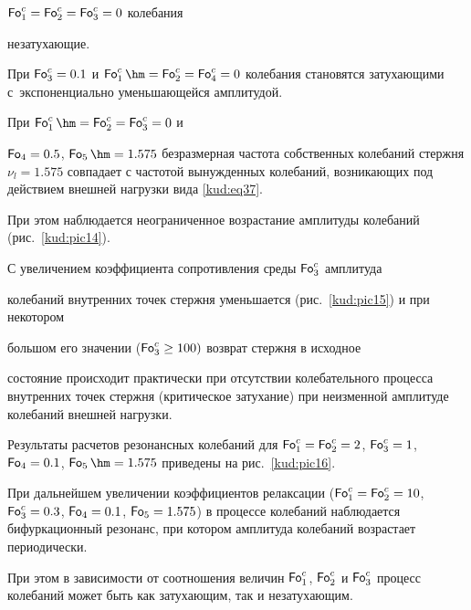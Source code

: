 $\operatorname{\sf Fo}_ 1^c =\operatorname{\sf Fo}_ {2}^c =\operatorname{\sf Fo}_3^c =0$ колебания

незатухающие. 

При $\operatorname{\sf Fo}_3^c =0.1$ и $\operatorname{\sf Fo}_ 1^c \hm

=\operatorname{\sf Fo}_ {2}^c =\operatorname{\sf Fo}_4^c =0$ колебания становятся затухающими с~экспоненциально уменьшающейся амплитудой. 

При $\operatorname{\sf Fo}_ 1^c \hm =\operatorname{\sf Fo}_ {2}^c =\operatorname{\sf Fo}_3 ^c =0$ и 

$\operatorname{\sf Fo}_4 =0.5$, $\operatorname{\sf Fo}_5 \hm =1.575$ безразмерная частота собственных колебаний стержня $\nu_l =1.575$ совпадает с частотой вынужденных колебаний, возникающих под действием внешней нагрузки вида \eqref{kud:eq37}. 

При этом наблюдается неограниченное возрастание амплитуды колебаний (рис.~\ref{kud:pic14}).



С увеличением коэффициента сопротивления среды $\operatorname{\sf Fo}_3^c $ амплитуда

колебаний внутренних точек стержня уменьшается (рис.~\ref{kud:pic15}) и при некотором

большом его значении ($\operatorname{\sf Fo}_3^c \ge 100)$ возврат стержня в исходное

состояние происходит практически при отсутствии колебательного процесса внутренних точек стержня (критическое затухание) при неизменной амплитуде колебаний внешней нагрузки.



Результаты расчетов резонансных колебаний для $\operatorname{\sf Fo}_ 1^c =\operatorname{\sf Fo}_2^c =2$, $\operatorname{\sf Fo}_3^c =1$, $\operatorname{\sf Fo}_4 =0.1$, $\operatorname{\sf Fo}_5 \hm

=1.575$ приведены на рис.~\ref{kud:pic16}. 

При дальнейшем увеличении коэффициентов релаксации ($\operatorname{\sf Fo}_ 1^c =\operatorname{\sf Fo}_2^c =10$, $\operatorname{\sf Fo}_3^c =0.3$, $\operatorname{\sf Fo}_4 =0.1$, $\operatorname{\sf Fo}_5 =1.575$) в процессе колебаний наблюдается бифуркационный резонанс, при котором амплитуда колебаний возрастает периодически. 

При этом в зависимости от соотношения величин $\operatorname{\sf Fo}_ 1^c$, $\operatorname{\sf Fo}_ {2} ^c$ и $\operatorname{\sf Fo}_3^c $ процесс колебаний может быть как затухающим, так и незатухающим.



